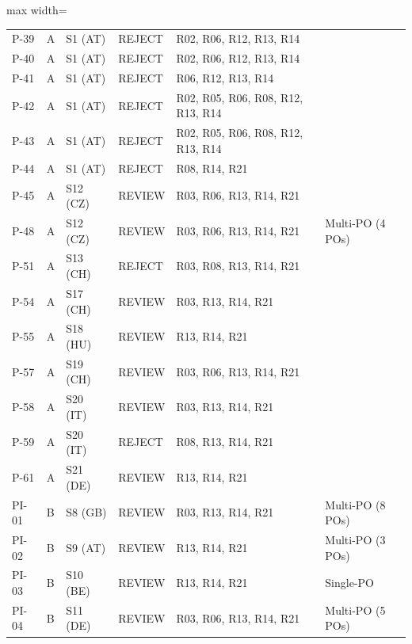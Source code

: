 \begin{table}[htbp]
\begin{adjustbox}{max width=\textwidth}
\begin{tabular}{@{}lllp{2.4cm}p{5.5cm}p{3cm}@{}}
P-39  & A & S1 (AT)  & REJECT  & R02, R06, R12, R13, R14                             & \\
P-40  & A & S1 (AT)  & REJECT  & R02, R06, R12, R13, R14                             & \\
P-41  & A & S1 (AT)  & REJECT  & R06, R12, R13, R14                                  & \\
P-42  & A & S1 (AT)  & REJECT  & R02, R05, R06, R08, R12, R13, R14                   & \\
P-43  & A & S1 (AT)  & REJECT  & R02, R05, R06, R08, R12, R13, R14                   & \\
P-44  & A & S1 (AT)  & REJECT  & R08, R14, R21                                       & \\
P-45  & A & S12 (CZ) & REVIEW  & R03, R06, R13, R14, R21 & \\
P-48  & A & S12 (CZ) & REVIEW  & R03, R06, R13, R14, R21 & Multi-PO (4 POs) \\
P-51  & A & S13 (CH) & REJECT  & R03, R08, R13, R14, R21                             & \\
P-54  & A & S17 (CH) & REVIEW  & R03, R13, R14, R21                                  & \\
P-55  & A & S18 (HU) & REVIEW  & R13, R14, R21                                       & \\
P-57  & A & S19 (CH) & REVIEW  & R03, R06, R13, R14, R21                             & \\
P-58  & A & S20 (IT) & REVIEW  & R03, R13, R14, R21                                  & \\
P-59  & A & S20 (IT) & REJECT  & R08, R13, R14, R21                                  & \\
P-61  & A & S21 (DE) & REVIEW  & R13, R14, R21                                       & \\
PI-01 & B & S8 (GB)  & REVIEW  & R03, R13, R14, R21                                  & Multi-PO (8 POs) \\
PI-02 & B & S9 (AT)  & REVIEW  & R13, R14, R21                                       & Multi-PO (3 POs) \\
PI-03 & B & S10 (BE) & REVIEW  & R13, R14, R21                                       & Single-PO \\
PI-04 & B & S11 (DE) & REVIEW  & R03, R06, R13, R14, R21                             & Multi-PO (5 POs) \\
\bottomrule
\end{tabular}
\end{adjustbox}
\end{table}

